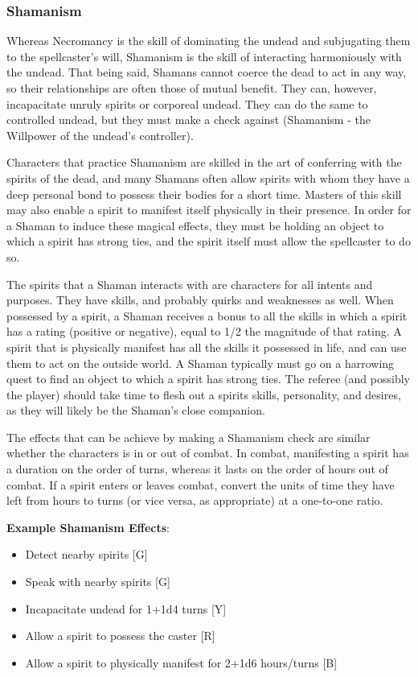 \documentclass[oneside]{book}
\begin{document}
\begin{multicols}{2}
\subsubsection{Shamanism}
Whereas Necromancy is the skill of dominating the undead and subjugating them to the spellcaster's will, Shamanism is the skill of interacting harmoniously with the undead. That being said, Shamans cannot coerce the dead to act in any way, so their relationships are often those of mutual benefit. They can, however, incapacitate unruly spirits or corporeal undead. They can do the same to controlled undead, but they must make a check against (Shamanism - the Willpower of the undead's controller).

Characters that practice Shamanism are skilled in the art of conferring with the spirits of the dead, and many Shamans often allow spirits with whom they have a deep personal bond to possess their bodies for a short time. Masters of this skill may also enable a spirit to manifest itself physically in their presence. In order for a Shaman to induce these magical effects, they must be holding an object to which a spirit has strong ties, and the spirit itself must allow the spellcaster to do so. 

The spirits that a Shaman interacts with are characters for all intents and purposes. They have skills, and probably quirks and weaknesses as well. When possessed by a spirit, a Shaman receives a bonus to all the skills in which a spirit has a rating (positive or negative), equal to 1/2 the magnitude of that rating. A spirit that is physically manifest has all the skills it possessed in life, and can use them to act on the outside world. A Shaman typically must go on a harrowing quest to find an object to which a spirit has strong ties. The referee (and possibly the player) should take time to flesh out a spirits skills, personality, and desires, as they will likely be the Shaman's close companion.

The effects that can be achieve by making a Shamanism check are similar whether the characters is in or out of combat. In combat, manifesting a spirit has a duration on the order of turns, whereas it lasts on the order of hours out of combat. If a spirit enters or leaves combat, convert the units of time they have left from hours to turns (or vice versa, as appropriate) at a one-to-one ratio. 

\textbf{Example Shamanism Effects}: 
	\begin{itemize}
		\setlength{\itemsep}{0cm}%
  		\setlength{\parskip}{0cm}%
		\item{ \small Detect nearby spirits [G]}
		\item{ \small Speak with nearby spirits [G]}
		\item{ \small Incapacitate undead for 1+1d4 turns [Y]}
		\item{ \small Allow a spirit to possess the caster [R]}
		\item{ \small Allow a spirit to physically manifest for 2+1d6 hours/turns [B]}
	\end{itemize}


\end{multicols}
\end{document}

